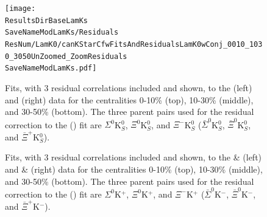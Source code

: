 \documentclass[/home/jesse/Analysis/FemtoAnalysis/AnalysisNotes/AnalysisNoteJBuxton.tex]{subfiles}
\renewcommand{\NonFlatBgdLamKch}{_NonFlatBgdCrctnPolynomial}
\renewcommand{\NonFlatBgdLamKs}{_NonFlatBgdCrctnLinear}
\renewcommand{\ResNum}{_3Res}
\renewcommand{\PrimMaxDecay}{_PrimMaxDecay10fm}
\renewcommand{\SaveNameModLamKch}{\MomRes\NonFlatBgdLamKch\ResNum\PrimMaxDecay\ResMethod\ParamFixAndShareLamKch}
\renewcommand{\SaveNameModLamKs}{\MomRes\NonFlatBgdLamKs\ResNum\PrimMaxDecay\ResMethod\ParamFixAndShareLamKs}
\begin{document}
\begin{landscape}
\begin{figure}[h]
  \centering
  \texttt{[image: \\ResultsDirBaseLamKs\\SaveNameModLamKs/Residuals\\ResNum/LamK0/canKStarCfwFitsAndResidualsLamK0wConj\_0010\_1030\_3050UnZoomed\_ZoomResiduals\\SaveNameModLamKs.pdf]}
  \caption[\LamALamKs Fits showing 3 Residuals]{Fits, with 3 residual correlations included and shown, to the \LamKs (left) and \ALamKs (right) data for the centralities 0-10\% (top), 10-30\% (middle), and 30-50\% (bottom).  The three parent pairs used for the residual correction to the \LamKs (\ALamKs) fit are $\Sigma^{0}$K$^{0}_{S}$, $\Xi^{0}$K$^{0}_{S}$, and $\Xi^{-}$K$^{0}_{S}$ ($\bar{\Sigma}^{0}$K$^{0}_{S}$, $\bar{\Xi}^{0}$K$^{0}_{S}$, and $\bar{\Xi}^{+}$K$^{0}_{S}$).}
  \label{fig:LamK0wConjFitsAndResiduals_3Res}
\end{figure}




\begin{figure}[h!]
  \centering
  \caption[\LamKchPALamKchM and \LamKchMALamKchP Fits with 3 Residuals]{Fits, with 3 residual correlations included and shown, to the \LamKchP \& \ALamKchM (left) and \LamKchM \& \ALamKchP (right) data for the centralities 0-10\% (top), 10-30\% (middle), and 30-50\% (bottom).  The three parent pairs used for the residual correction to the \LamKchP (\ALamKchM) fit are $\Sigma^{0}$K$^{+}$, $\Xi^{0}$K$^{+}$, and $\Xi^{-}$K$^{+}$ ($\bar{\Sigma}^{0}$K$^{-}$, $\bar{\Xi}^{0}$K$^{-}$, and $\bar{\Xi}^{+}$K$^{-}$).}
  \label{fig:LamKchwConjFitsAndResiduals_3Res}
\end{figure}




\end{landscape}
\pagestyle{plain}
\end{document}
